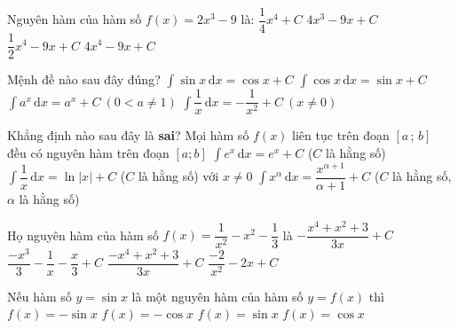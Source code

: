 \begin{ex}%
	Nguyên hàm của hàm số $ f(x)=2x^3-9$ là:
	\choice
	{$\dfrac{1}{4}{x^4}+C$}
	{$ 4x^3-9x+C$}
	{\True $\dfrac{1}{2}{x^4}-9x+C$}
	{$ 4x^4-9x+C$}
\end{ex}

\begin{ex}%
	Mệnh đề nào sau đây đúng?
	\choice
	{$\displaystyle\int\sin x\mathrm{\,d}x=\cos x+C$}
	{\True $\displaystyle\int\cos x\mathrm{\,d}x=\sin x+C$}
	{$\displaystyle\int a^x\mathrm{\,d}x=a^x+C~\left(0< a\ne 1\right)$}
	{$\displaystyle\int\dfrac{1}{x}\mathrm{\,d}x=-\dfrac{1}{x^2}+C~\left(x\ne 0\right)$}
\end{ex}

\begin{ex}%
	Khẳng định nào sau đây là \textbf{sai}?
	\choice
	{Mọi hàm số $ f(x)$ liên tục trên đoạn $\left[a\,;\,b\right]$ đều có nguyên hàm trên đoạn $\left[a;b\right]$}
	{$\displaystyle\int e^x\mathrm{\,d}x=e^x+C$ ($C$ là hằng số)}
	{$\displaystyle\int \dfrac{1}{x}\mathrm{\,d}x=\ln \left| x\right|+C$ ($ C$ là hằng số) với $ x\ne 0$}
	{\True $\displaystyle\int x^\alpha\mathrm{\,d}x=\dfrac{x^{\alpha+1}}{\alpha+1}+C$ ($ C$ là hằng số, $\alpha$ là hằng số)}
\end{ex}

\begin{ex}%
	Họ nguyên hàm của hàm số $ f(x)=\dfrac{1}{x^2}-x^2-\dfrac{1}{3}$ là
	\choice
	{$-\dfrac{x^4+x^2+3}{3x}+C$}
	{\True $\dfrac{-x^3}{3}-\dfrac{1}{x}-\dfrac{x}{3}+C$}
	{$\dfrac{-x^4+x^2+3}{3x}+C$}
	{$\dfrac{-2}{x^2}-2x+C$}
\end{ex}

\begin{ex}%
	Nếu hàm số $ y=\sin x$ là một nguyên hàm của hàm số $ y=f(x)$ thì
	\choice
	{$f(x)=-\sin x$}
	{$f(x)=-\cos x$}
	{$f(x)=\sin x$}
	{\True $f(x)=\cos x$}
\end{ex}

